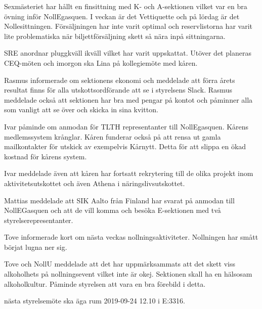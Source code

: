 \documentclass[10pt]{article}
\begin{document}
\begin{paragrafer}
\begin{paragrafer}
Sexmästeriet har hållt en finsittning med K- och A-sektionen vilket var en bra övning inför NollEgasquen. I veckan är det Vettiquette och på lördag är det Nollesittningen. 
Försäljningen har inte varit optimal och reservlistorna har varit lite problematiska när biljettförsäljning skett så nära inpå sittningarna. 

SRE anordnar pluggkväll ikväll vilket har varit uppskattat. Utöver det planeras CEQ-möten och imorgon ska Lina på kollegiemöte med kåren. 

Rasmus informerade om sektionens ekonomi och meddelade att förra årets resultat finns för alla utskottsordförande att se i styrelsens Slack. 
Rasmus meddelade också att sektionen har bra med pengar på kontot och påminner alla som vanligt att se över och skicka in sina kvitton. 


Ivar påminde om anmodan för TLTH representanter till NollEgasquen. Kårens medlemssystem krånglar. Kåren funderar också på att rensa ut gamla mailkontakter för utskick av exempelvis Kårnytt. Detta för att slippa en ökad kostnad för kårens system. 

Ivar meddelade även att kåren har fortsatt rekrytering till de olika projekt inom aktivitetsutskottet och även Athena i näringslivsutskottet.

Mattias meddelade att SIK Aalto från Finland har svarat på anmodan till NollEGasquen och att de vill komma och besöka E-sektionen med två styrelserepresentanter.

\end{paragrafer}


Tove informerade kort om nästa veckas nollningsaktiviteter. Nollningen har smått börjat lugna ner sig. 

Tove och NollU meddelade att det har uppmärksammats att det skett viss alkoholhets på nollningsevent vilket inte är okej. Sektionen skall ha en hälsosam alkoholkultur. 
Påminde styrelsen att vara en bra förebild i detta. 

\Mba nästa styrelsemöte ska äga rum 2019-09-24 12.10 i E:3316.



\end{paragrafer}
\end{document}
